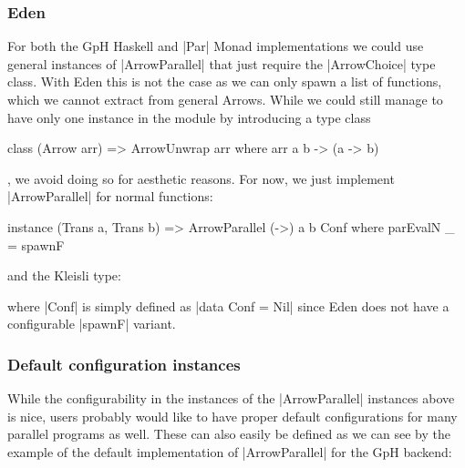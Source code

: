 \subsubsection{Eden}
For both the GpH Haskell and |Par| Monad implementations we could use general instances of |ArrowParallel| that just require the |ArrowChoice| type class. With Eden this is not the case as we can only spawn a list of functions, which we cannot extract from general Arrows. While we could still manage to have only one instance in the module by introducing a type class %
\begin{code}
class (Arrow arr) => ArrowUnwrap arr where
	arr a b -> (a -> b)
\end{code}
, we avoid doing so for aesthetic reasons. For now, we just implement |ArrowParallel| for normal functions: %
\begin{code}
instance (Trans a, Trans b) => ArrowParallel (->) a b Conf where
    parEvalN _ = spawnF
\end{code}
and the Kleisli type: %
where |Conf| is simply defined as |data Conf = Nil| since Eden does not have a configurable |spawnF| variant.

\subsubsection{Default configuration instances}
While the configurability in the instances of the |ArrowParallel| instances above is nice, users probably would like to have proper default configurations for many parallel programs as well. These can also easily be defined as we can see by the example of the default implementation of |ArrowParallel| for the GpH backend:

